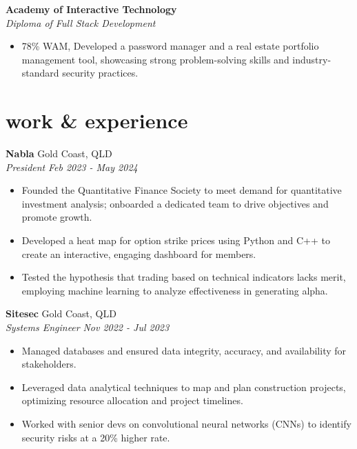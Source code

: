\documentclass[12pt]{article}
\begin{document}
\textbf{Academy of Interactive Technology} \\
\indent \textit{\color{subtextgray}Diploma of Full Stack Development}
\begin{itemize}[topsep=0em, left=0.8em]	
  \item 78\% WAM, Developed a password manager and a real estate portfolio management tool, showcasing strong problem-solving skills and industry-standard security practices.
\end{itemize}

\vspace{1em}

\section{work \& experience}

\vspace{0.20em}

\textbf{Nabla} \hfill {Gold Coast, QLD} \\
\indent \textit{\color{subtextgray}President} \hfill \textit{\color{subtextgray}Feb 2023 - May 2024}
\begin{itemize}[noitemsep, topsep=0em, left=0.8em]
  \item Founded the Quantitative Finance Society to meet demand for quantitative investment analysis; onboarded a dedicated team to drive objectives and promote growth.
  \item	Developed a heat map for option strike prices using Python and C++ to create an interactive, engaging dashboard for members.
  \item Tested the hypothesis that trading based on technical indicators lacks merit, employing machine learning to analyze effectiveness in generating alpha.
\end{itemize}

\textbf{Sitesec} \hfill {Gold Coast, QLD} \\
\indent \textit{\color{subtextgray}Systems Engineer} \hfill \textit{\color{subtextgray}Nov 2022 - Jul 2023}
\begin{itemize}[noitemsep, topsep=0em, left=0.8em]
  \item Managed databases and ensured data integrity, accuracy, and availability for stakeholders.
  \item	Leveraged data analytical techniques to map and plan construction projects, optimizing resource allocation and project timelines.
  \item Worked with senior devs on convolutional neural networks (CNNs) to identify security risks at a 20\% higher rate.
\end{itemize}
\end{document}
